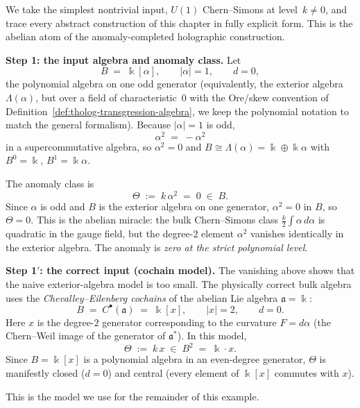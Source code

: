 \begin{example}
\label{ex:abelian-cs-anomaly-completion}
We take the simplest nontrivial input, $U(1)$ Chern--Simons at
level~$k\neq 0$, and trace every abstract construction of this chapter
in fully explicit form. This is the abelian atom of the anomaly-completed
holographic construction.

\medskip
\noindent\textbf{Step 1: the input algebra and anomaly class.}
Let
\[
B \;=\; \Bbbk[\alpha],
\qquad |\alpha|=1,\qquad d=0,
\]
the polynomial algebra on one odd generator (equivalently, the
exterior algebra $\Lambda(\alpha)$, but over a field of
characteristic~$0$ with the Ore/skew convention of
Definition~\ref{def:tholog-transgression-algebra}, we keep
the polynomial notation to match the general formalism).
Because $|\alpha|=1$ is odd,
\[
\alpha^2 \;=\; -\alpha^2
\]
in a supercommutative algebra, so $\alpha^2=0$ and $B\cong\Lambda(\alpha)
= \Bbbk\oplus\Bbbk\alpha$ with $B^0=\Bbbk$, $B^1=\Bbbk\alpha$.

The anomaly class is
\[
\Theta \;:=\; k\,\alpha^2 \;=\; 0 \;\in\; B.
\]
Since $\alpha$ is odd and $B$ is the exterior algebra on one generator,
$\alpha^2=0$ in $B$, so $\Theta=0$.
This is the abelian miracle: the bulk Chern--Simons class
$\frac{k}{2}\int\alpha\,d\alpha$ is quadratic in the gauge field, but
the degree-$2$ element $\alpha^2$ vanishes identically in the exterior
algebra. The anomaly is \emph{zero at the strict polynomial level}.

\medskip
\noindent\textbf{Step 1$'$: the correct input (cochain model).}
The vanishing above shows that the naive exterior-algebra model is too
small. The physically correct bulk algebra uses the \emph{Chevalley--Eilenberg
cochains} of the abelian Lie algebra $\mathfrak{a}=\Bbbk$:
\[
B \;=\; C^\bullet(\mathfrak{a}) \;=\; \Bbbk[x],
\qquad |x|=2,\qquad d=0.
\]
Here $x$ is the degree-$2$ generator corresponding to the curvature
$F=d\alpha$ (the Chern--Weil image of the generator of $\mathfrak{a}^*$).
In this model,
\[
\Theta \;:=\; k\,x \;\in\; B^2 \;=\; \Bbbk\cdot x.
\]
Since $B=\Bbbk[x]$ is a polynomial algebra in an even-degree generator,
$\Theta$ is manifestly closed ($d=0$) and central (every element of
$\Bbbk[x]$ commutes with $x$).

This is the model we use for the remainder of this example.


\end{example}
